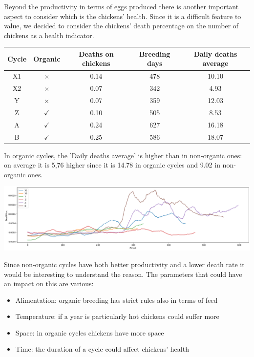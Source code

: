 \documentclass[11pt]{article}
\begin{document}
Beyond the productivity in terms of eggs produced there is another important aspect to consider which is the chickens' health. Since it is a difficult feature to value,
we decided to consider the chickens' death percentage on the number of chickens as a health indicator.

\begin{center}
    \begin{tabular}{| c | c | c | c | c |}
        \hline
        Cycle & Organic      & Deaths on chickens & Breeding days & Daily deaths average \\ [0.5ex]
        \hline
        X1    & $\times$     & 0.14               & 478           & 10.10                \\ [0.5ex]
        \hline
        X2    & $\times$     & 0.07               & 342           & 4.93                 \\ [0.5ex]
        \hline
        Y     & $\times$     & 0.07               & 359           & 12.03                \\ [0.5ex]
        \hline
        Z     & $\checkmark$ & 0.10               & 505           & 8.53                 \\ [0.5ex]
        \hline
        A     & $\checkmark$ & 0.24               & 627           & 16.18                \\ [0.5ex]
        \hline
        B     & $\checkmark$ & 0.25               & 586           & 18.07                \\ [0.5ex]
        \hline
    \end{tabular}
\end{center}

In organic cycles, the 'Daily deaths average' is higher than in non-organic ones: on average it is 5,76 higher since it is 14.78 in organic cycles and 9.02 in non-organic ones.

\includegraphics[width=\linewidth]{../Results/OrganingOrNot/DeathPerc.png}

Since non-organic cycles have both better productivity and a lower death rate it would be interesting to understand the reason. The parameters that could have an impact on this are various:
\begin{itemize}
    \item Alimentation: organic breeding has strict rules also in terms of feed
    \item Temperature: if a year is particularly hot chickens could suffer more
    \item Space: in organic cycles chickens have more space
    \item Time: the duration of a cycle could affect chickens' health
\end{itemize}
\end{document}
